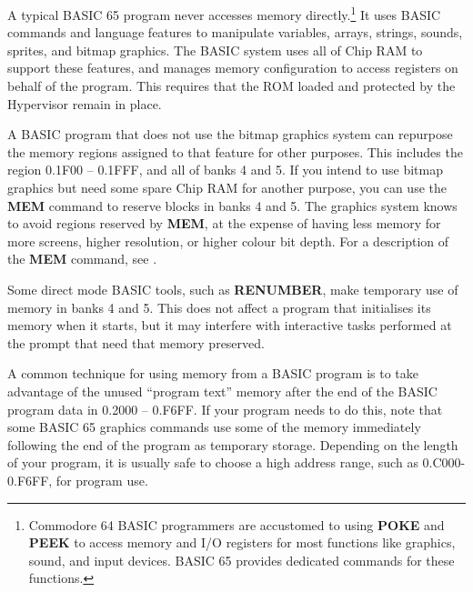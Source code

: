 A typical BASIC 65 program never accesses memory directly.\footnote{Commodore 64 BASIC programmers are accustomed to using {\bf POKE} and {\bf PEEK} to access memory and I/O registers for most functions like graphics, sound, and input devices. BASIC 65 provides dedicated commands for these functions.} It uses BASIC commands and language features to manipulate variables, arrays, strings, sounds, sprites, and bitmap graphics. The BASIC system uses all of Chip RAM to support these features, and manages memory configuration to access registers on behalf of the program. This requires that the ROM loaded and protected by the Hypervisor remain in place.

A BASIC program that does not use the bitmap graphics system can repurpose the memory regions assigned to that feature for other purposes. This includes the region 0.1F00 -- 0.1FFF, and all of banks 4 and 5. If you intend to use bitmap graphics but need some spare Chip RAM for another purpose, you can use the {\bf MEM} command to reserve blocks in banks 4 and 5. The graphics system knows to avoid regions reserved by {\bf MEM}, at the expense of having less memory for more screens, higher resolution, or higher colour bit depth. For a description of the {\bf MEM} command, see .

Some direct mode BASIC tools, such as {\bf RENUMBER}, make temporary use of memory in banks 4 and 5. This does not affect a program that initialises its memory when it starts, but it may interfere with interactive tasks performed at the  prompt that need that memory preserved.

A common technique for using memory from a BASIC program is to take advantage of the unused ``program text'' memory after the end of the BASIC program data in 0.2000 -- 0.F6FF. If your program needs to do this, note that some BASIC 65 graphics commands use some of the memory immediately following the end of the program as temporary storage. Depending on the length of your program, it is usually safe to choose a high address range, such as 0.C000-0.F6FF, for program use.

